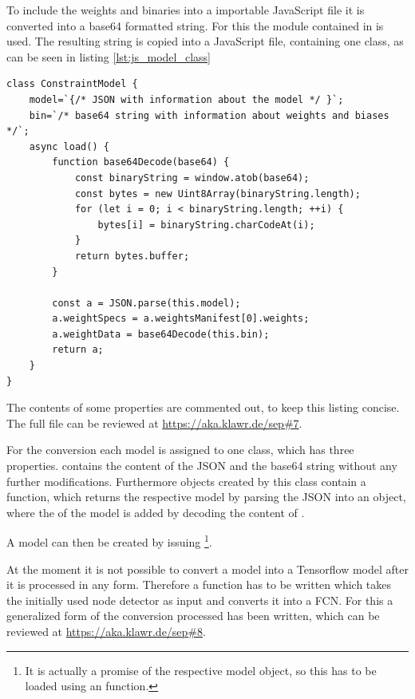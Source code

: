 To include the weights and binaries into a importable JavaScript file it is converted into a base64 formatted string.
For this the  \cite{Josefsson2018} module contained in  is used.
The resulting string is copied into a JavaScript file, containing one class, as can be seen in listing \ref{lst:js_model_class}

\begin{lstlisting}[label={lst:js_model_class}, caption={[JavaScript classes for Tensorflow.js] Class definition of one of the models providing necessary functions to be used by \code{tf.loadLayersModel} to return a usable model in JavaScript. }]
class ConstraintModel {
    model=`{/* JSON with information about the model */ }`;
    bin=`/* base64 string with information about weights and biases */`;
    async load() {
        function base64Decode(base64) {
            const binaryString = window.atob(base64);
            const bytes = new Uint8Array(binaryString.length);
            for (let i = 0; i < binaryString.length; ++i) {
                bytes[i] = binaryString.charCodeAt(i);
            }
            return bytes.buffer;
        }
    
        const a = JSON.parse(this.model);
        a.weightSpecs = a.weightsManifest[0].weights;
        a.weightData = base64Decode(this.bin);
        return a;
    }
}
\end{lstlisting}

The contents of some properties are commented out, to keep this listing concise.
The full file can be reviewed at \url{https://aka.klawr.de/sep\#7}. %

For the conversion each model is assigned to one class, which has three properties.
 contains the content of the JSON and  the base64 string without any further modifications.
Furthermore objects created by this class contain a  function, which returns the respective model by parsing the JSON into an object, where the  of the model is added by decoding the content of .

A model can then be created by issuing \footnote{It is actually a promise of the respective model object, so this has to be loaded using an  function.}.

At the moment it is not possible to convert a model into a Tensorflow model after it is processed in any form.
Therefore a function has to be written which takes the initially used node detector as input and converts it into a FCN.
For this a generalized form of the conversion processed has been written, which can be reviewed at \url{https://aka.klawr.de/sep\#8}. %


